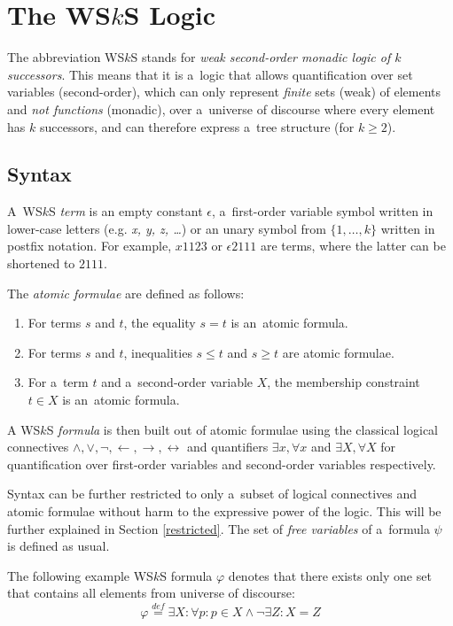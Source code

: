 \noindent\hrulefill

\chapter{The WS$k$S Logic}\label{wsks}
The abbreviation WS$k$S stands for \emph{weak second-order monadic logic of $k$
successors}. This means that it is a~logic that allows quantification over set
variables (second-order), which can only represent \emph{finite} sets (weak) of
elements and \emph{not functions} (monadic), over a~universe of discourse where
every element has $k$ successors, and can therefore express a~tree structure
(for $k \geq 2$).
 
 \section{Syntax}
 A~WS$k$S \emph{term} is an empty constant $\epsilon$, a~first-order variable
 symbol written in lower-case letters (e.g. \emph{x, y, z, \ldots}) or an unary
 symbol from $\{1,\ldots,k\}$ written in postfix notation.
 For example, $x1123$ or $\epsilon2111$ are terms, where the latter can be
 shortened to $2111$.

The \emph{atomic formulae} are defined as follows:
 \begin{enumerate}
  \item For terms $s$ and $t$, the equality $s = t$ is an~atomic formula.
\item For terms $s$ and $t$, inequalities $s \leq t$ and $s \geq t$ are atomic
formulae.
\item For a~term $t$ and a~second-order variable $X$, the membership constraint
$t \in X$ is an~atomic formula.
 \end{enumerate}

A WS$k$S \emph{formula} is then built out of atomic formulae using the
classical logical connectives $\wedge, \vee, \neg, \leftarrow, \rightarrow,
\leftrightarrow$ and quantifiers $\exists x, \forall x$ and $\exists X, \forall
X$ for quantification over first-order variables and second-order variables
respectively.

Syntax can be further restricted to only a~subset of logical connectives and
atomic formulae without harm to the expressive power of the logic. This will be
further explained in Section \ref{restricted}. The set of \emph{free variables}
of a~formula $\psi$ is defined as usual.
  
  \noindent\hrulefill
  \begin{example}
  The following example WS$k$S formula $\varphi$ denotes that there exists only
  one set that contains all elements from universe of discourse:
  \begin{equation}
   \varphi \overset{\mathit{def}}{=} \exists X: \forall p: p \in X \wedge
   \neg\exists Z:
   X = Z
  \end{equation}
   \hrulefill
  \end{example}\label{wsks-formula}
  
